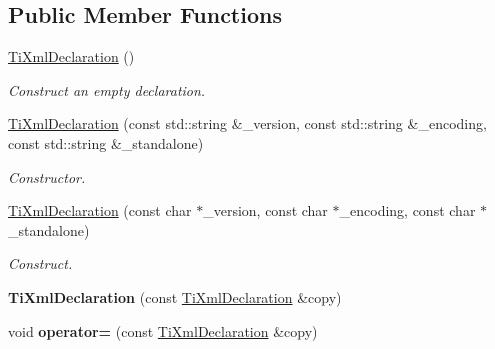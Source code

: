 \subsection*{Public Member Functions}
\begin{DoxyCompactItemize}
\item 
\hypertarget{class_ti_xml_declaration_aa0484d059bea0ea1acb47c9094382d79}{
\hyperlink{class_ti_xml_declaration_aa0484d059bea0ea1acb47c9094382d79}{TiXmlDeclaration} ()}
\label{class_ti_xml_declaration_aa0484d059bea0ea1acb47c9094382d79}

\begin{DoxyCompactList}\small\item\em Construct an empty declaration. \item\end{DoxyCompactList}\item 
\hypertarget{class_ti_xml_declaration_acd5556007c3c72209465081de39d9836}{
\hyperlink{class_ti_xml_declaration_acd5556007c3c72209465081de39d9836}{TiXmlDeclaration} (const std::string \&\_\-version, const std::string \&\_\-encoding, const std::string \&\_\-standalone)}
\label{class_ti_xml_declaration_acd5556007c3c72209465081de39d9836}

\begin{DoxyCompactList}\small\item\em Constructor. \item\end{DoxyCompactList}\item 
\hypertarget{class_ti_xml_declaration_a3b618d1c30c25e4b7a71f31a595ee298}{
\hyperlink{class_ti_xml_declaration_a3b618d1c30c25e4b7a71f31a595ee298}{TiXmlDeclaration} (const char $\ast$\_\-version, const char $\ast$\_\-encoding, const char $\ast$\_\-standalone)}
\label{class_ti_xml_declaration_a3b618d1c30c25e4b7a71f31a595ee298}

\begin{DoxyCompactList}\small\item\em Construct. \item\end{DoxyCompactList}\item 
\hypertarget{class_ti_xml_declaration_a58ac9042c342f7845c8491da0bb091e8}{
{\bfseries TiXmlDeclaration} (const \hyperlink{class_ti_xml_declaration}{TiXmlDeclaration} \&copy)}
\label{class_ti_xml_declaration_a58ac9042c342f7845c8491da0bb091e8}

\item 
\hypertarget{class_ti_xml_declaration_a0fedc57539af9049be8db2d7d9d9ba33}{
void {\bfseries operator=} (const \hyperlink{class_ti_xml_declaration}{TiXmlDeclaration} \&copy)}
\label{class_ti_xml_declaration_a0fedc57539af9049be8db2d7d9d9ba33}


\end{DoxyCompactItemize}
